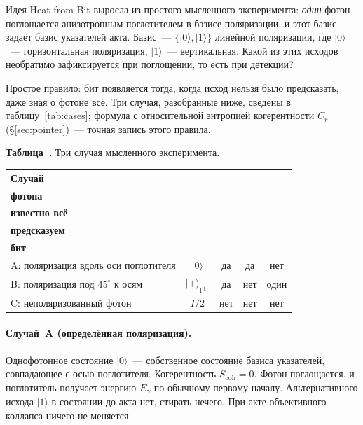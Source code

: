\documentclass[11pt,a4paper]{article}
\newcommand{\Sref}[1]{\hyperref[#1]{\S\ref{#1}}}
\begin{document}
Идея Heat from Bit выросла из простого мысленного эксперимента: \emph{один} фотон поглощается анизотропным поглотителем в базисе поляризации, и этот базис задаёт базис указателей акта. Базис~--- $\{|0\rangle,|1\rangle\}$ линейной поляризации, где $|0\rangle$~--- горизонтальная поляризация, $|1\rangle$~--- вертикальная. Какой из этих исходов необратимо зафиксируется при поглощении, то есть при детекции?

Простое правило: бит появляется тогда, когда исход нельзя было предсказать, даже зная о фотоне всё. Три случая, разобранные ниже, сведены в таблицу~\ref{tab:cases}; формула с относительной энтропией когерентности $C_r$ (\Sref{sec:pointer})~--- точная запись этого правила.

\vspace{0.4em}
\noindent\begin{minipage}{\textwidth}
\noindent{}\label{tab:cases}%
{\centering
\textbf{Таблица~\thetable.} Три случая мысленного эксперимента.\par\vspace{0.25em}
{\footnotesize
\setlength{\tabcolsep}{4pt}
\renewcommand{\arraystretch}{1.12}
\begin{tabular}{|l|c|c|c|c|}
\hline
\textbf{Случай} & \makecell{\textbf{Состояние}\\\textbf{фотона}} & \makecell{\textbf{О фотоне}\\\textbf{известно всё}} & \makecell{\textbf{Исход}\\\textbf{предсказуем}} & \makecell{\textbf{Новый}\\\textbf{бит}} \\
\hline
A: поляризация вдоль оси поглотителя & $|0\rangle$ & да & да & нет \\
\hline
B: поляризация под $45^\circ$ к осям & $|{+}\rangle_{\mathrm{ptr}}$ & да & нет & один \\
\hline
C: неполяризованный фотон & $I/2$ & нет & нет & нет \\
\hline
\end{tabular}
}
\par}
\end{minipage}
\vspace{0.6em}

\paragraph{Случай~A (определённая поляризация).}
Однофотонное состояние $|0\rangle$~--- собственное состояние базиса указателей, совпадающее с осью поглотителя. Когерентность $S_{\mathrm{coh}}=0$. Фотон поглощается, и поглотитель получает энергию $E_\gamma$ по обычному первому началу. Альтернативного исхода $|1\rangle$ в состоянии до акта нет, стирать нечего. При акте объективного коллапса ничего не меняется.
\end{document}
